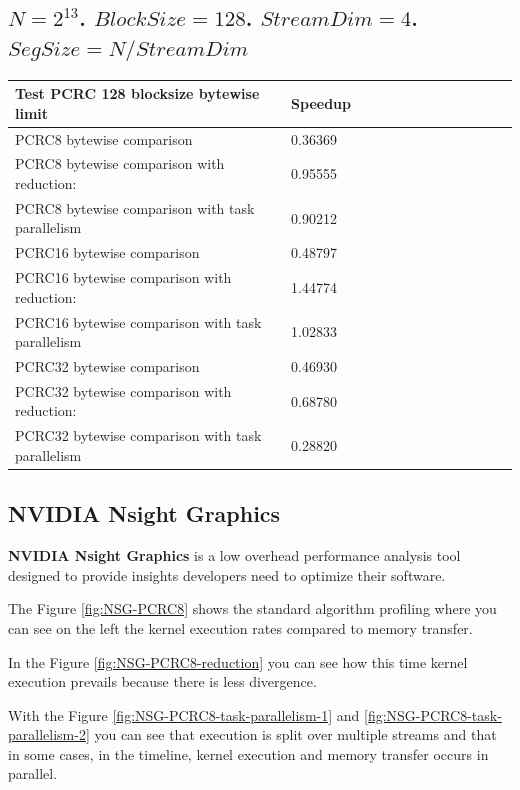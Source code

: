 \documentclass[fleqn]{IEEEtran}
\begin{document}
\subsection{$N=2^{13}$. $BlockSize=128$. $StreamDim=4$. $SegSize=N/StreamDim$}
\begin{footnotesize}
	\begin{tabular}{l|l|l|l|l|r|r|r|r|r|r||c|c|}
		\toprule
		\textbf{Test PCRC 128 blocksize bytewise limit} & \textbf{Speedup} \\
		\midrule
		PCRC8 bytewise comparison                       &	0.36369  \\
		PCRC8 bytewise comparison with reduction:       &	0.95555  \\
		PCRC8 bytewise comparison with task parallelism &	0.90212  \\
		PCRC16 bytewise comparison                       &	0.48797  \\
		PCRC16 bytewise comparison with reduction:       &	1.44774  \\
		PCRC16 bytewise comparison with task parallelism &	1.02833  \\
		PCRC32 bytewise comparison                       &	0.46930  \\
		PCRC32 bytewise comparison with reduction:       &	0.68780  \\
		PCRC32 bytewise comparison with task parallelism &	0.28820  \\
		\bottomrule
	\end{tabular}
\end{footnotesize}

\subsection{NVIDIA Nsight Graphics}
\textbf{NVIDIA Nsight Graphics} is a low overhead performance analysis tool 
designed to provide insights developers need to optimize their software. 

The Figure \ref{fig:NSG-PCRC8} shows the standard algorithm profiling where 
you can see on the left the kernel execution rates compared to memory transfer.

In the Figure \ref{fig:NSG-PCRC8-reduction} you can see how this time kernel 
execution prevails because there is less divergence. 

With the Figure \ref{fig:NSG-PCRC8-task-parallelism-1} and 
\ref{fig:NSG-PCRC8-task-parallelism-2} you can see that 
execution is split over multiple streams and that in some cases, 
in the timeline, kernel execution and memory transfer occurs in parallel.
\end{document}
